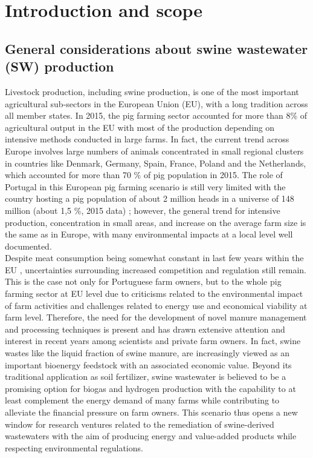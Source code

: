 \section{Introduction and scope}
\subsection{General considerations about swine wastewater (SW) production}

Livestock production, including swine production, is one of the most important agricultural sub-sectors in the European Union (EU), with a long tradition across all member states. In 2015, the pig farming sector accounted for more than 8\% of agricultural output \cite{Eurostat2016} in the EU with most of the production depending on intensive methods conducted in large farms. In fact, the current trend across Europe involves large numbers of animals concentrated in small regional clusters in countries like Denmark, Germany, Spain, France, Poland and the Netherlands, which accounted for more than 70 \% of pig population \cite{Eurostat2016} in 2015. The role of Portugal in this European pig farming scenario is still very limited with the country hosting a pig population of about 2 million heads in a universe of 148 million (about 1,5 \%, 2015 data) \cite{Eurostat2016}; however, the general trend for intensive production, concentration in small areas, and increase on the average farm size is the same as in Europe, with many environmental impacts at a local level well documented.\\
Despite meat consumption being somewhat constant in last few years within the EU \cite{OECD2016}, uncertainties surrounding increased competition and regulation still remain. This is the case not only for Portuguese farm owners, but to the whole pig farming sector at EU level due to criticisms related to the environmental impact of farm activities and challenges related to energy use and economical viability at farm level. Therefore, the need for the development of novel manure management and processing techniques is present and has drawn extensive attention and interest in recent years among scientists and private farm owners. In fact, swine wastes like the liquid fraction of swine manure, are increasingly viewed as an important bioenergy feedstock with an associated economic value. Beyond its traditional application as soil fertilizer, swine wastewater is believed to be a promising option for biogas and hydrogen production with the capability to at least complement the energy demand of many farms while contributing to alleviate the financial pressure on farm owners. This scenario thus opens a new window for research ventures related to the remediation of swine-derived wastewaters with the aim of producing energy and value-added products while respecting environmental regulations.

